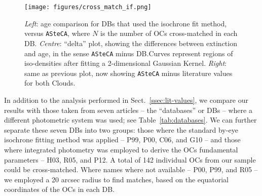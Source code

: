 \documentclass[a4paper,fleqn,usenatbib]{mnras}
\begin{document}
\begin{figure*}
\texttt{[image: figures/cross\_match\_if.png]}
\caption{\emph{Left}: age comparison for DBs that used the isochrone fit
method, versus \texttt{ASteCA}, where $N$ is the number of OCs cross-matched in
each DB.\@
\emph{Centre}: ``delta'' plot, showing the differences between extinction
and age, in the sense \texttt{ASteCA} minus DB.\@ Curves represent regions of
iso-densities after fitting a 2-dimensional Gaussian Kernel.
\emph{Right}: same as previous plot, now showing \texttt{ASteCA} minus
literature values for both Clouds.}
\label{fig:cross_match_if}
\end{figure*}

In addition to the analysis performed in Sect.~\ref{ssec:lit-values}, we compare
our results with those taken from seven articles -- the ``databases'' or DBs --
where a different photometric system was used; see Table~\ref{tab:databases}.
%
We can further separate these seven DBs into two groups: those where the
standard by-eye isochrone fitting method was applied -- P99, P00, C06, and G10
-- and those where integrated photometry was employed to derive the OCs
fundamental parameters -- H03, R05, and P12.
%
A total of 142 individual OCs from our sample could be cross-matched. Where
names where not available -- P00, P99, and R05 -- we employed a 20 arcsec radius
to find matches, based on the equatorial coordinates of the OCs in each DB.
\end{document}
